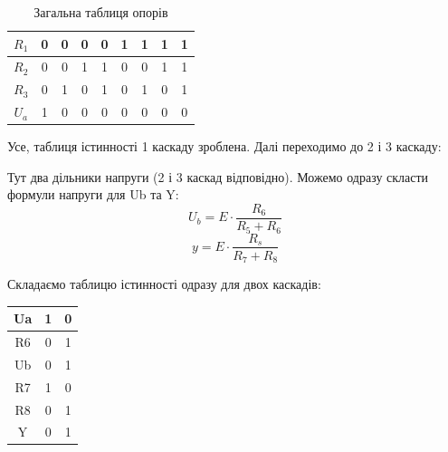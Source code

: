 \documentclass[a4paper,14pt]{extreport}
\begin{document}
  \begin{table}[h]
  \caption{Загальна таблиця опорів}
    \begin{center}
      \begin{tabular}{|c|c|c|c|c|c|c|c|c|}
      \hline
      $R_1 $  & 0 & 0 & 0 & 0 & 1 & 1 & 1 & 1   \\ \hline
      $R_2 $  & 0 & 0 & 1 & 1 & 0 & 0 & 1 & 1 \\ \hline
      $R_3 $  & 0 & 1 & 0 & 1 & 0 & 1 & 0 & 1 \\ \hline
      $U_a $  & 1 & 0 & 0 & 0 & 0 & 0 & 0 & 0\\ \hline
      \end{tabular}
    \end{center}
  \end{table}
  Усе, таблиця істинності 1 каскаду зроблена. Далі переходимо до 2 і 3 каскаду:\\
  \begin{figure}[h!]
  \label{ris5}
  \end{figure}

  Тут два дільники напруги (2 і 3 каскад відповідно). Можемо одразу скласти формули напруги для Ub та Y:
  $$ U_b = E\cdot \dfrac{R_6}{R_5+R_6}$$
  $$ y = E\cdot \dfrac{R_s}{R_7+R_8}$$

  Складаємо таблицю істинності одразу для двох каскадів:

  \begin{table}[h]
    \begin{center}
    \begin{tabular}{|c|c|c|}
    \hline
    Ua & 1 & 0 \\ \hline
    R6 & 0 & 1 \\ \hline
    Ub & 0 & 1 \\ \hline
    R7 & 1 & 0 \\ \hline
    R8 & 0 & 1 \\ \hline
    Y  & 0 & 1 \\ \hline
    \end{tabular}
    \end{center}
  \end{table}
\end{document}
